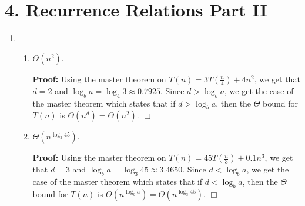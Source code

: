 \documentclass[11pt]{article}
\def\endproofmark{$\Box$}
\newenvironment{proof}{\par{\bf Proof:}}{\endproofmark\smallskip}
\begin{document}
\section*{4. Recurrence Relations Part II}
\begin{enumerate}[label=(\alph*)]
\item
\begin{enumerate}[label=(\roman*)]
\item
$\Theta(n^2)$.
\begin{proof}
Using the master theorem on $T(n) = 3T(\frac{n} {4}) + 4n^2$, we get that $d = 2$ and $\log_b{a} = \log_4{3} \approx 0.7925$. Since $d > \log_b{a}$, we get the case of the master theorem which states that if $d > \log_b{a}$, then the $\Theta$ bound for $T(n)$ is $\Theta(n^d) = \Theta(n^2)$.
\end{proof}

\item
$\Theta(n^{\log_3{45}})$.
\begin{proof}
Using the master theorem on $T(n) = 45T(\frac{n} {3}) + 0.1n^3$, we get that $d = 3$ and $\log_b{a} = \log_3{45} \approx 3.4650$. Since $d < \log_b{a}$, we get the case of the master theorem which states that if $d < \log_b{a}$, then the $\Theta$ bound for $T(n)$ is $\Theta(n^{\log_b{a}}) = \Theta(n^{\log_3{45}})$.
\end{proof}


\end{enumerate}
\end{enumerate}
\end{document}
